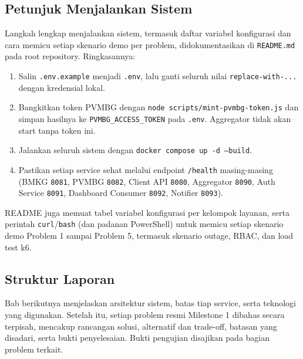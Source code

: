 \subsection{Petunjuk Menjalankan Sistem}
\label{sec:petunjuk-menjalankan}

Langkah lengkap menjalankan sistem, termasuk daftar variabel konfigurasi dan
cara memicu setiap skenario demo per problem, didokumentasikan di
\texttt{README.md} pada root repository. Ringkasannya:

\begin{enumerate}
  \item Salin \texttt{.env.example} menjadi \texttt{.env}, lalu ganti seluruh
  nilai \texttt{replace-with-...} dengan kredensial lokal.
  \item Bangkitkan token PVMBG dengan \texttt{node scripts/mint-pvmbg-token.js}
  dan simpan hasilnya ke \texttt{PVMBG\_ACCESS\_TOKEN} pada \texttt{.env}.
  Aggregator tidak akan start tanpa token ini.
  \item Jalankan seluruh sistem dengan \texttt{docker compose up -d --build}.
  \item Pastikan setiap service sehat melalui endpoint \texttt{/health}
  masing-masing (BMKG \texttt{8081}, PVMBG \texttt{8082}, Client API \texttt{8080},
  Aggregator \texttt{8090}, Auth Service \texttt{8091}, Dashboard Consumer
  \texttt{8092}, Notifier \texttt{8093}).
\end{enumerate}

README juga memuat tabel variabel konfigurasi per kelompok layanan, serta
perintah \texttt{curl}/\texttt{bash} (dan padanan PowerShell) untuk memicu
setiap skenario demo Problem 1 sampai Problem 5, termasuk skenario outage,
RBAC, dan load test k6.

\subsection{Struktur Laporan}

Bab berikutnya menjelaskan arsitektur sistem, batas tiap service, serta teknologi
yang digunakan. Setelah itu, setiap problem resmi Milestone 1 dibahas secara
terpisah, mencakup rancangan solusi, alternatif dan trade-off, batasan yang
disadari, serta bukti penyelesaian. Bukti pengujian disajikan pada bagian
problem terkait.
